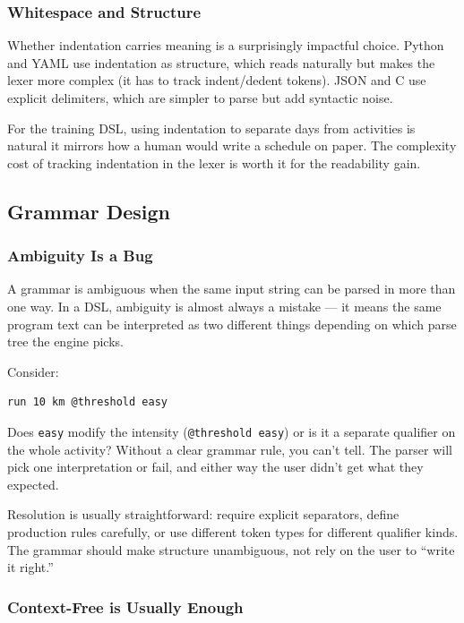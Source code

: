 \subsubsection{Whitespace and Structure}

Whether indentation carries meaning is a surprisingly impactful choice. Python and YAML
use indentation as structure, which reads naturally but makes the lexer more complex
(it has to track indent/dedent tokens). JSON and C use explicit delimiters, which are
simpler to parse but add syntactic noise.

For the training DSL, using indentation to separate days from activities is natural it
mirrors how a human would write a schedule on paper. The complexity cost of tracking
indentation in the lexer is worth it for the readability gain.

\subsection{Grammar Design}

\subsubsection{Ambiguity Is a Bug}

A grammar is ambiguous when the same input string can be parsed in more than one way.
In a DSL, ambiguity is almost always a mistake --- it means the same program text can be
interpreted as two different things depending on which parse tree the engine picks.

Consider:
\begin{lstlisting}
run 10 km @threshold easy
\end{lstlisting}
Does \texttt{easy} modify the intensity (\texttt{@threshold easy}) or is it a separate
qualifier on the whole activity? Without a clear grammar rule, you can't tell. The parser
will pick one interpretation or fail, and either way the user didn't get what they expected.

Resolution is usually straightforward: require explicit separators, define production
rules carefully, or use different token types for different qualifier kinds. The grammar
should make structure unambiguous, not rely on the user to ``write it right.''

\subsubsection{Context-Free is Usually Enough}

